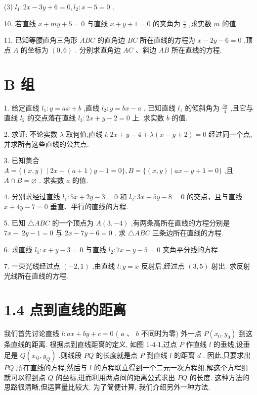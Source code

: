 \documentclass[10pt]{article}
\begin{document}
(3) \({l}_{1} : {2x} - {3y} + 6 = 0,{l}_{2} : x - 5 = 0\) .

10. 若直线 \(x + {my} + 5 = 0\) 与直线 \(x + y + 1 = 0\) 的夹角为 \(\frac{\pi }{4}\) ,求实数 \(m\) 的值.

11. 已知等腰直角三角形 \({ABC}\) 的直角边 \({BC}\) 所在直线的方程为 \(x - {2y} - 6 = 0\) ,顶点 \(A\) 的坐标为 \(\left( {0,6}\right)\) . 分别求直角边 \({AC}\) 、斜边 \({AB}\) 所在直线的方程.

\section*{B 组}

1. 给定直线 \({l}_{1} : y = {ax} + b\) ,直线 \({l}_{2} : y = {bx} - a\) . 已知直线 \({l}_{1}\) 的倾斜角为 \(\frac{3\pi }{4}\) ,且它与直线 \({l}_{2}\) 的交点落在直线 \({l}_{3} : {2x} + y - 2 = 0\) 上. 求实数 \(b\) 的值.

2. 求证: 不论实数 \(\lambda\) 取何值,直线 \(l : {2x} + y - 4 + \lambda \left( {x - y + 2}\right)  = 0\) 经过同一个点, 并求所有这些直线的公共点.

3. 已知集合 \(A = \{ \left( {x,y}\right)  \mid  {{2x} - \left( {a + 1}\right) y - 1 = 0}\} ,B = \{ \left( {x,y}\right)  \mid  {{ax} - y + 1 = 0}\}\) ,且 \(A \cap  B = \varnothing\) . 求实数 \(a\) 的值.

4. 分别求经过直线 \({l}_{1} : {5x} + {2y} - 3 = 0\) 和 \({l}_{2} : {3x} - {5y} - 8 = 0\) 的交点，且与直线 \(x + {4y} - 7 = 0\) 垂直、平行的直线的方程.

5. 已知 \(\bigtriangleup {ABC}\) 的一个顶点为 \(A\left( {3, - 4}\right)\) ,有两条高所在直线的方程分别是 \({7x} - \; {2y} - 1 = 0\) 与 \({2x} - {7y} - 6 = 0\) . 求 \(\bigtriangleup {ABC}\) 三条边所在直线的方程.

6. 求直线 \({l}_{1} : x + y - 3 = 0\) 与直线 \({l}_{2} : {7x} - y - 5 = 0\) 夹角平分线的方程.

7. 一束光线经过点 \(\left( {-2,1}\right)\) ,由直线 \(l : y = x\) 反射后,经过点 \(\left( {3,5}\right)\) 射出. 求反射光线所在直线的方程.

\section*{1.4 点到直线的距离}

我们首先讨论直线 \(l : {ax} + {by} + c = 0\) ( \(a\text{ 、 }b\) 不同时为零) 外一点 \(P\left( {{x}_{0},{y}_{0}}\right)\) 到这条直线的距离. 根据点到直线距离的定义, 如图 1-4-1,过点 \(P\) 作直线 \(l\) 的垂线,设垂足是 \(Q\left( {{x}_{Q},{y}_{Q}}\right)\) ,则线段 \({PQ}\) 的长度就是点 \(P\) 到直线 \(l\) 的距离 \(d\) . 因此,只要求出 \({PQ}\) 所在直线的方程,然后与 \(l\) 的方程联立得到一个二元一次方程组,解这个方程组就可以得到点 \(Q\) 的坐标,进而利用两点间的距离公式求出 \({PQ}\) 的长度. 这种方法的思路很清晰,但运算量比较大. 为了简便计算, 我们介绍另外一种方法.
\end{document}
